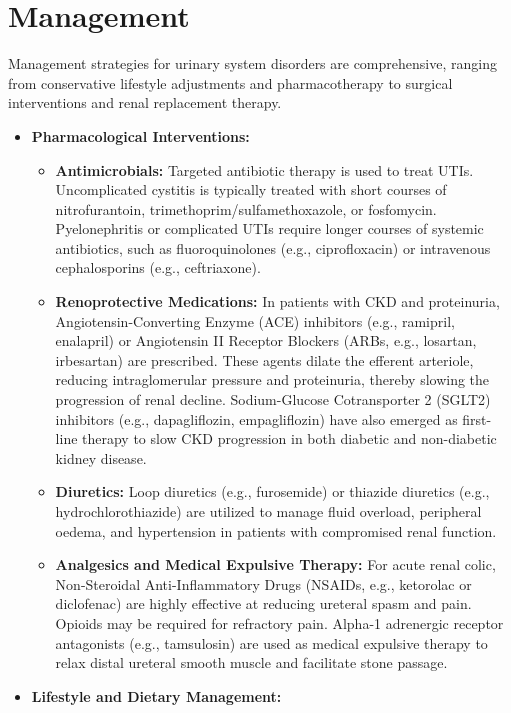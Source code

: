 \section*{Management}
Management strategies for urinary system disorders are comprehensive, ranging from conservative lifestyle adjustments and pharmacotherapy to surgical interventions and renal replacement therapy.

\begin{itemize}
    \item \textbf{Pharmacological Interventions:}
    \begin{itemize}
        \item \textbf{Antimicrobials:} Targeted antibiotic therapy is used to treat UTIs. Uncomplicated cystitis is typically treated with short courses of nitrofurantoin, trimethoprim/sulfamethoxazole, or fosfomycin. Pyelonephritis or complicated UTIs require longer courses of systemic antibiotics, such as fluoroquinolones (e.g., ciprofloxacin) or intravenous cephalosporins (e.g., ceftriaxone).
        \item \textbf{Renoprotective Medications:} In patients with CKD and proteinuria, Angiotensin-Converting Enzyme (ACE) inhibitors (e.g., ramipril, enalapril) or Angiotensin II Receptor Blockers (ARBs, e.g., losartan, irbesartan) are prescribed. These agents dilate the efferent arteriole, reducing intraglomerular pressure and proteinuria, thereby slowing the progression of renal decline. Sodium-Glucose Cotransporter 2 (SGLT2) inhibitors (e.g., dapagliflozin, empagliflozin) have also emerged as first-line therapy to slow CKD progression in both diabetic and non-diabetic kidney disease.
        \item \textbf{Diuretics:} Loop diuretics (e.g., furosemide) or thiazide diuretics (e.g., hydrochlorothiazide) are utilized to manage fluid overload, peripheral oedema, and hypertension in patients with compromised renal function.
        \item \textbf{Analgesics and Medical Expulsive Therapy:} For acute renal colic, Non-Steroidal Anti-Inflammatory Drugs (NSAIDs, e.g., ketorolac or diclofenac) are highly effective at reducing ureteral spasm and pain. Opioids may be required for refractory pain. Alpha-1 adrenergic receptor antagonists (e.g., tamsulosin) are used as medical expulsive therapy to relax distal ureteral smooth muscle and facilitate stone passage.
    \end{itemize}
    \item \textbf{Lifestyle and Dietary Management:}

\end{itemize}
